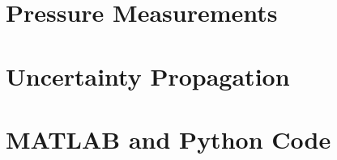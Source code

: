 \documentclass[runningheads]{llncs}
\begin{document}








\appendix

\section{Pressure Measurements}

\section{Uncertainty Propagation}

\section{MATLAB and Python Code}
\end{document}

